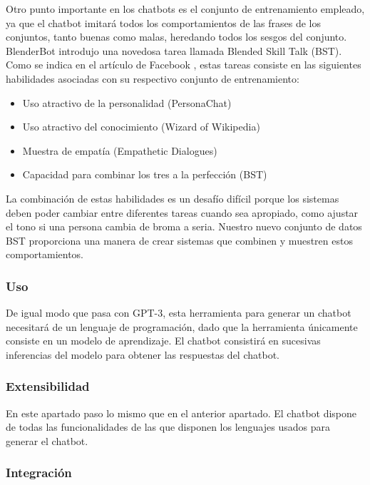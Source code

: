 Otro punto importante en los chatbots es el conjunto de entrenamiento empleado, ya que el chatbot imitará todos los comportamientos de las frases de los conjuntos, tanto buenas como malas, heredando todos los sesgos del conjunto. BlenderBot introdujo una novedosa tarea llamada Blended Skill Talk (BST). Como se indica en el artículo de Facebook \cite{RefWorks:RefID:41-roller2020recipes}, estas tareas consiste en las siguientes habilidades asociadas con su respectivo conjunto de entrenamiento:

\begin{itemize}
\item Uso atractivo de la personalidad (PersonaChat)
\item Uso atractivo del conocimiento (Wizard of Wikipedia)
\item Muestra de empatía (Empathetic Dialogues)
\item Capacidad para combinar los tres a la perfección (BST)
\end{itemize}

La combinación de estas habilidades es un desafío difícil porque los sistemas deben poder cambiar entre diferentes tareas cuando sea apropiado, como ajustar el tono si una persona cambia de broma a seria. Nuestro nuevo conjunto de datos BST proporciona una manera de crear sistemas que combinen y muestren estos comportamientos.

\subsubsection*{Uso}

De igual modo que pasa con GPT-3, esta herramienta para generar un chatbot necesitará de un lenguaje de programación, dado que la herramienta únicamente consiste en un modelo de aprendizaje. El chatbot consistirá en sucesivas inferencias del modelo para obtener las respuestas del chatbot.

\subsubsection*{Extensibilidad}

En este apartado paso lo mismo que en el anterior apartado. El chatbot dispone de todas las funcionalidades de las que disponen los lenguajes usados para generar el chatbot.

\subsubsection*{Integración}

